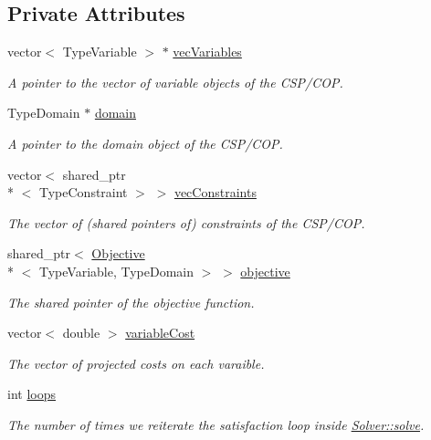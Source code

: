 \subsection*{Private Attributes}
\begin{DoxyCompactItemize}
\item 
vector$<$ Type\-Variable $>$ $\ast$ \hyperlink{classghost_1_1Solver_a2d033a454234b2277aabdcc4d89eaba2}{vec\-Variables}
\begin{DoxyCompactList}\small\item\em A pointer to the vector of variable objects of the C\-S\-P/\-C\-O\-P. \end{DoxyCompactList}\item 
Type\-Domain $\ast$ \hyperlink{classghost_1_1Solver_ad9292e9219261ba8058fec05b453c0c9}{domain}
\begin{DoxyCompactList}\small\item\em A pointer to the domain object of the C\-S\-P/\-C\-O\-P. \end{DoxyCompactList}\item 
vector$<$ shared\-\_\-ptr\\*
$<$ Type\-Constraint $>$ $>$ \hyperlink{classghost_1_1Solver_a170746edcfb777b12978444c2ab3962e}{vec\-Constraints}
\begin{DoxyCompactList}\small\item\em The vector of (shared pointers of) constraints of the C\-S\-P/\-C\-O\-P. \end{DoxyCompactList}\item 
shared\-\_\-ptr$<$ \hyperlink{classghost_1_1Objective}{Objective}\\*
$<$ Type\-Variable, Type\-Domain $>$ $>$ \hyperlink{classghost_1_1Solver_a4fd74bd68d0ea253fd35adad697f964d}{objective}
\begin{DoxyCompactList}\small\item\em The shared pointer of the objective function. \end{DoxyCompactList}\item 
vector$<$ double $>$ \hyperlink{classghost_1_1Solver_a76c1057367112ead0304b436b5f508f1}{variable\-Cost}
\begin{DoxyCompactList}\small\item\em The vector of projected costs on each varaible. \end{DoxyCompactList}\item 
int \hyperlink{classghost_1_1Solver_aa6a77e14862a9be467e6c6c76124b526}{loops}
\begin{DoxyCompactList}\small\item\em The number of times we reiterate the satisfaction loop inside \hyperlink{classghost_1_1Solver_a30dd2769fb30ac42d231d2c305dcdf13}{Solver\-::solve}. \end{DoxyCompactList}\item 

\end{DoxyCompactItemize}
